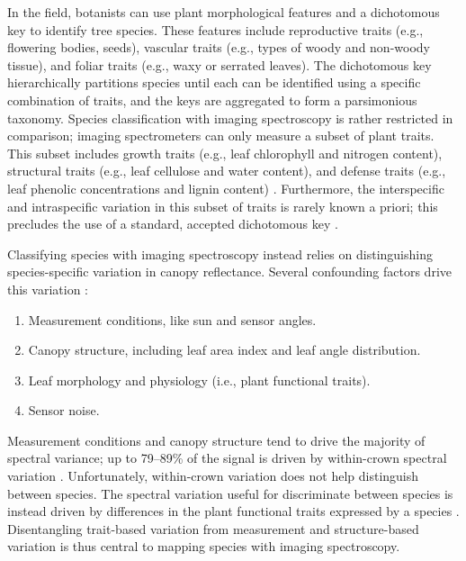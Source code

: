 In the field, botanists can use plant morphological features and a dichotomous key to identify tree species. These features include reproductive traits (e.g., flowering bodies, seeds), vascular traits (e.g., types of woody and non-woody tissue), and foliar traits (e.g., waxy or serrated leaves). The dichotomous key hierarchically partitions species until each can be identified using a specific combination of traits, and the keys are aggregated to form a parsimonious taxonomy. Species classification with imaging spectroscopy is rather restricted in comparison; imaging spectrometers can only measure a subset of plant traits. This subset includes growth traits (e.g., leaf chlorophyll and nitrogen content), structural traits (e.g., leaf cellulose and water content), and defense traits (e.g., leaf phenolic concentrations and lignin content) \cite{Lepine2016-dg, Papes2010-qc, McManus2016-nv}. Furthermore, the interspecific and intraspecific variation in this subset of traits is rarely known a priori; this precludes the use of a standard, accepted dichotomous key \cite{Kichenin2013-vq,Siefert2015-sk}.

Classifying species with imaging spectroscopy instead relies on distinguishing species-specific variation in canopy reflectance. Several confounding factors drive this variation \cite{Ollinger2011-fz, Lausch2016-fk}:

\begin{enumerate}
    \item Measurement conditions, like sun and sensor angles.
    \item Canopy structure, including leaf area index and leaf angle distribution.
    \item Leaf morphology and physiology (i.e., plant functional traits).
    \item Sensor noise.
\end{enumerate}

Measurement conditions and canopy structure tend to drive the majority of spectral variance; up to 79–89\% of the signal is driven by within-crown spectral variation \cite{Baldeck2014-du, Yao2015-dp}. Unfortunately, within-crown variation does not help distinguish between species. The spectral variation useful for discriminate between species is instead driven by differences in the plant functional traits expressed by a species \cite{Asner2011-tn, Martin2018-fg}. Disentangling trait-based variation from measurement and structure-based variation is thus central to mapping species with imaging spectroscopy.

